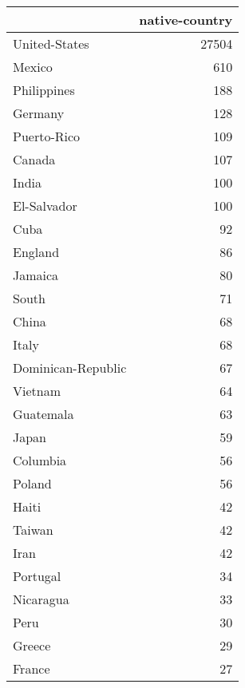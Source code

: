 \begin{tabular}{lr}
\toprule
{} &  native-country \\
\midrule
 United-States              &           27504 \\
 Mexico                     &             610 \\
 Philippines                &             188 \\
 Germany                    &             128 \\
 Puerto-Rico                &             109 \\
 Canada                     &             107 \\
 India                      &             100 \\
 El-Salvador                &             100 \\
 Cuba                       &              92 \\
 England                    &              86 \\
 Jamaica                    &              80 \\
 South                      &              71 \\
 China                      &              68 \\
 Italy                      &              68 \\
 Dominican-Republic         &              67 \\
 Vietnam                    &              64 \\
 Guatemala                  &              63 \\
 Japan                      &              59 \\
 Columbia                   &              56 \\
 Poland                     &              56 \\
 Haiti                      &              42 \\
 Taiwan                     &              42 \\
 Iran                       &              42 \\
 Portugal                   &              34 \\
 Nicaragua                  &              33 \\
 Peru                       &              30 \\
 Greece                     &              29 \\
 France                     &              27 \\

\end{tabular}
